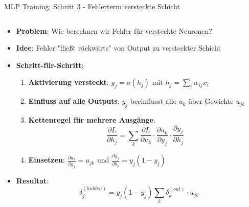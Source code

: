\documentclass[aspectratio=1610, xcolor=dvipsnames, 9pt]{beamer}
\begin{document}
      \begin{frame}{MLP Training: Schritt 3 - Fehlerterm versteckte Schicht}
        \begin{columns}
          \begin{column}{1\textwidth}
            \begin{itemize}
              \item \textbf{Problem}: Wie berechnen wir Fehler für versteckte Neuronen?
              \item \textbf{Idee}: Fehler "fließt rückwärts" von Output zu versteckter Schicht
              \item \textbf{Schritt-für-Schritt}:
              \begin{enumerate}
                \item \textbf{Aktivierung versteckt}: $y_j = \sigma(h_j)$ mit $h_j = \sum_i w_{ij} x_i$
                \item \textbf{Einfluss auf alle Outputs}: $y_j$ beeinflusst alle $u_k$ über Gewichte $u_{jk}$
                \item \textbf{Kettenregel für mehrere Ausgänge}:
                \begin{equation}
                  \frac{\partial L}{\partial h_j} = \sum_k \frac{\partial L}{\partial u_k} \cdot \frac{\partial u_k}{\partial y_j} \cdot \frac{\partial y_j}{\partial h_j}
                \end{equation}
                \item \textbf{Einsetzen}: $\frac{\partial u_k}{\partial y_j} = u_{jk}$ und $\frac{\partial y_j}{\partial h_j} = y_j(1-y_j)$
              \end{enumerate}
              \item \textbf{Resultat}:
              \begin{equation}
                \delta_j^{(hidden)} = y_j(1-y_j) \sum_k \delta_k^{(out)} \cdot u_{jk}
              \end{equation}
            \end{itemize}
          \end{column}
        \end{columns}
      \end{frame}
\end{document}
